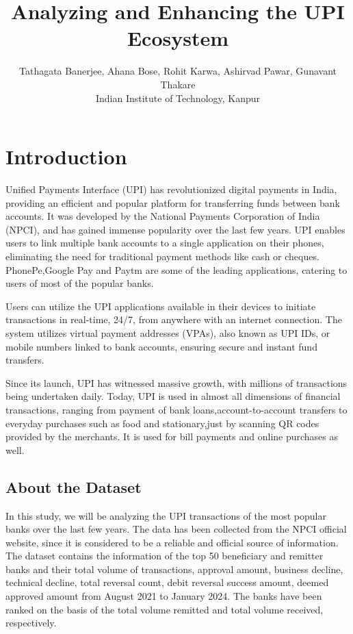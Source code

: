 \documentclass{article}
\title{Analyzing and Enhancing the UPI Ecosystem}
\author{Tathagata Banerjee, Ahana Bose, Rohit Karwa, Ashirvad Pawar, Gunavant Thakare \\ 
Indian Institute of Technology, Kanpur}
\begin{document}
\maketitle

\section{Introduction}

Unified Payments Interface (UPI) has revolutionized digital payments in India, providing an efficient and popular platform for transferring funds between bank accounts. It was developed by the National Payments Corporation of India (NPCI), and has gained immense popularity over the last few years. UPI enables users to link multiple bank accounts to a single application on their phones, eliminating the need for traditional payment methods like cash or cheques. PhonePe,Google Pay and Paytm are some of the leading applications, catering to users of most of the popular banks.

Users can utilize the UPI applications available in their devices to initiate transactions in real-time, 24/7, from anywhere with an internet connection. The system utilizes virtual payment addresses (VPAs), also known as UPI IDs, or mobile numbers linked to bank accounts, ensuring secure and instant fund transfers.

Since its launch, UPI has witnessed massive growth, with millions of transactions being undertaken daily. Today, UPI is used in almost all dimensions of financial transactions, ranging from payment of bank loans,account-to-account transfers to everyday purchases such as food and stationary,just by scanning QR codes provided by the merchants. It is used for bill payments and online purchases as well.

\subsection{About the Dataset}

In this study, we will be analyzing the UPI transactions of the most popular banks over the last few years. The data has been collected from the NPCI official website, since it is considered to be a reliable and official source of information. The dataset contains the information of the top 50 beneficiary and remitter banks and their total volume of transactions, approval amount, business decline, technical decline, total reversal count, debit reversal success amount, deemed approved amount from August 2021 to January 2024. The banks have been ranked on the basis of the total volume remitted and total volume received, respectively.
\end{document}
